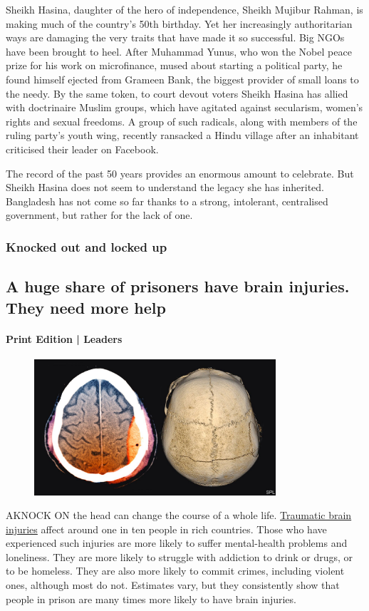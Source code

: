 \documentclass{article}
\begin{document}
Sheikh Hasina, daughter of the hero of independence, Sheikh Mujibur Rahman, is making much of the country's 50th birthday. Yet her increasingly authoritarian ways are damaging the very traits that have made it so successful. Big NGOs have been brought to heel. After Muhammad Yunus, who won the Nobel peace prize for his work on microfinance, mused about starting a political party, he found himself ejected from Grameen Bank, the biggest provider of small loans to the needy. By the same token, to court devout voters Sheikh Hasina has allied with doctrinaire Muslim groups, which have agitated against secularism, women's rights and sexual freedoms. A group of such radicals, along with members of the ruling party's youth wing, recently ransacked a Hindu village after an inhabitant criticised their leader on Facebook. 

The record of the past 50 years provides an enormous amount to celebrate. But Sheikh Hasina does not seem to understand the legacy she has inherited. Bangladesh has not come so far thanks to a strong, intolerant, centralised government, but rather for the lack of one. {} 
\clearpage
\subsubsection{Knocked out and locked up }
\subsection{A huge share of prisoners have brain injuries. They need more help }
\paragraph{Print Edition | Leaders  \quad \color{gray}{Mar 27th 2021 }}
\begin{figure}[h]
\centering
\includegraphics[width=0.8\textwidth]{images/20210327_LDP002_0.jpg}
\end{figure}
\lettrine{A} KNOCK ON the head can change the course of a whole life. \href{/international/2021/03/27/brain-injuries-are-startlingly-common-among-those-who-have-committed-crimes}{Traumatic brain injuries} affect around one in ten people in rich countries. Those who have experienced such injuries are more likely to suffer mental-health problems and loneliness. They are more likely to struggle with addiction to drink or drugs, or to be homeless. They are also more likely to commit crimes, including violent ones, although most do not. Estimates vary, but they consistently show that people in prison are many times more likely to have brain injuries. 
\end{document}
